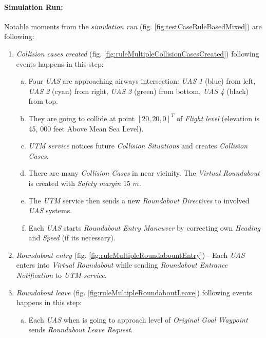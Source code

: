 \paragraph{Simulation Run:} Notable moments from the \emph{simulation run} (fig. \ref{fig:testCaseRuleBasedMixed}) are following:

\begin{enumerate}
	\item \emph{Collision cases created} (fig. \ref{fig:ruleMultipleCollisionCasesCreated}) following events happens in this step:
	\begin{enumerate}[a.]
		\item Four \emph{UAS} are approaching airways intersection: \emph{UAS 1} (blue) from left, \emph{UAS 2} (cyan) from right, \emph{UAS 3} (green) from bottom, \emph{UAS 4} (black) from top.
		
		\item They are going to collide at point $[20,20,0]^T$ of \emph{Flight level} (elevation is 45, 000 feet Above Mean Sea Level).
		
		\item \emph{UTM service} notices future \emph{Collision Situations} and creates \emph{Collision Cases}.
		
		\item There are many \emph{Collision Cases} in near vicinity. The \emph{Virtual Roundabout} is created with \emph{Safety margin} $15$ $m$.
		
		\item The \emph{UTM} service then sends a new \emph{Roundabout Directives} to involved \emph{UAS} systems.
		
		\item Each \emph{UAS} starts \emph{Roundabout Entry Maneuver} by correcting own  \emph{Heading} and \emph{Speed} (if its necessary).
	\end{enumerate}   
	
	\item \emph{Roundabout entry} (fig. \ref{fig:ruleMultipleRoundabountEntry}) - Each \emph{UAS} enters into \emph{Virtual Roundabout} while sending \emph{Roundabout Entrance Notification} to \emph{UTM service}.
	
	\item \emph{Roundabout leave} (fig. \ref{fig:ruleMultipleRoundaboutLeave})  following events happens in this step:
	\begin{enumerate}[a.]
		\item Each \emph{UAS} when is going to approach level of \emph{Original Goal Waypoint} sends \emph{Roundabout Leave Request}.
		

\end{enumerate}
\end{enumerate}
